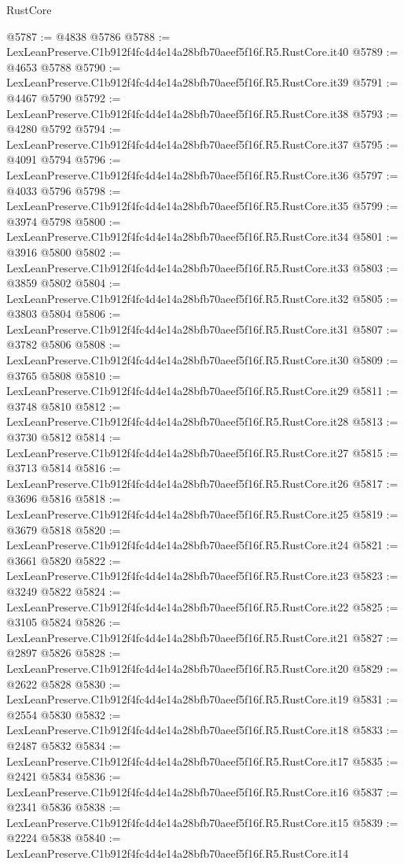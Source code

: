 \begin{lexlean}{RustCore}
\begin{coremodule}
@5787 := @4838 @5786
@5788 := LexLeanPreserve.C1b912f4fc4d4e14a28bfb70aeef5f16f.R5.RustCore.it40
@5789 := @4653 @5788
@5790 := LexLeanPreserve.C1b912f4fc4d4e14a28bfb70aeef5f16f.R5.RustCore.it39
@5791 := @4467 @5790
@5792 := LexLeanPreserve.C1b912f4fc4d4e14a28bfb70aeef5f16f.R5.RustCore.it38
@5793 := @4280 @5792
@5794 := LexLeanPreserve.C1b912f4fc4d4e14a28bfb70aeef5f16f.R5.RustCore.it37
@5795 := @4091 @5794
@5796 := LexLeanPreserve.C1b912f4fc4d4e14a28bfb70aeef5f16f.R5.RustCore.it36
@5797 := @4033 @5796
@5798 := LexLeanPreserve.C1b912f4fc4d4e14a28bfb70aeef5f16f.R5.RustCore.it35
@5799 := @3974 @5798
@5800 := LexLeanPreserve.C1b912f4fc4d4e14a28bfb70aeef5f16f.R5.RustCore.it34
@5801 := @3916 @5800
@5802 := LexLeanPreserve.C1b912f4fc4d4e14a28bfb70aeef5f16f.R5.RustCore.it33
@5803 := @3859 @5802
@5804 := LexLeanPreserve.C1b912f4fc4d4e14a28bfb70aeef5f16f.R5.RustCore.it32
@5805 := @3803 @5804
@5806 := LexLeanPreserve.C1b912f4fc4d4e14a28bfb70aeef5f16f.R5.RustCore.it31
@5807 := @3782 @5806
@5808 := LexLeanPreserve.C1b912f4fc4d4e14a28bfb70aeef5f16f.R5.RustCore.it30
@5809 := @3765 @5808
@5810 := LexLeanPreserve.C1b912f4fc4d4e14a28bfb70aeef5f16f.R5.RustCore.it29
@5811 := @3748 @5810
@5812 := LexLeanPreserve.C1b912f4fc4d4e14a28bfb70aeef5f16f.R5.RustCore.it28
@5813 := @3730 @5812
@5814 := LexLeanPreserve.C1b912f4fc4d4e14a28bfb70aeef5f16f.R5.RustCore.it27
@5815 := @3713 @5814
@5816 := LexLeanPreserve.C1b912f4fc4d4e14a28bfb70aeef5f16f.R5.RustCore.it26
@5817 := @3696 @5816
@5818 := LexLeanPreserve.C1b912f4fc4d4e14a28bfb70aeef5f16f.R5.RustCore.it25
@5819 := @3679 @5818
@5820 := LexLeanPreserve.C1b912f4fc4d4e14a28bfb70aeef5f16f.R5.RustCore.it24
@5821 := @3661 @5820
@5822 := LexLeanPreserve.C1b912f4fc4d4e14a28bfb70aeef5f16f.R5.RustCore.it23
@5823 := @3249 @5822
@5824 := LexLeanPreserve.C1b912f4fc4d4e14a28bfb70aeef5f16f.R5.RustCore.it22
@5825 := @3105 @5824
@5826 := LexLeanPreserve.C1b912f4fc4d4e14a28bfb70aeef5f16f.R5.RustCore.it21
@5827 := @2897 @5826
@5828 := LexLeanPreserve.C1b912f4fc4d4e14a28bfb70aeef5f16f.R5.RustCore.it20
@5829 := @2622 @5828
@5830 := LexLeanPreserve.C1b912f4fc4d4e14a28bfb70aeef5f16f.R5.RustCore.it19
@5831 := @2554 @5830
@5832 := LexLeanPreserve.C1b912f4fc4d4e14a28bfb70aeef5f16f.R5.RustCore.it18
@5833 := @2487 @5832
@5834 := LexLeanPreserve.C1b912f4fc4d4e14a28bfb70aeef5f16f.R5.RustCore.it17
@5835 := @2421 @5834
@5836 := LexLeanPreserve.C1b912f4fc4d4e14a28bfb70aeef5f16f.R5.RustCore.it16
@5837 := @2341 @5836
@5838 := LexLeanPreserve.C1b912f4fc4d4e14a28bfb70aeef5f16f.R5.RustCore.it15
@5839 := @2224 @5838
@5840 := LexLeanPreserve.C1b912f4fc4d4e14a28bfb70aeef5f16f.R5.RustCore.it14

\end{coremodule}
\end{lexlean}
